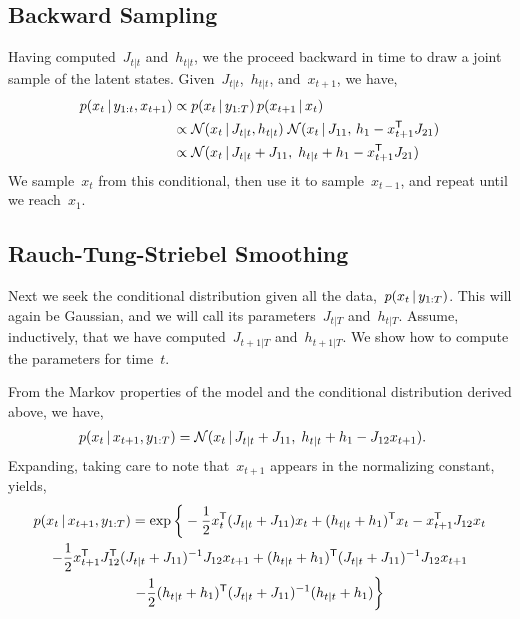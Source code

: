 \documentclass{article}
\begin{document}
\subsection*{Backward Sampling}
Having computed~$J_{t|t}$ and~$h_{t|t}$, we the proceed backward in time to draw a joint sample of the latent states. 
Given~$J_{t|t}$,~$h_{t|t}$, and~$x_{t+1}$, we have,
\begin{align}
  p(x_{t} \,|\, y_{1:t}, x_{t+1}) &\propto p(x_t \,|\, y_{1:T}) \, p(x_{t+1} \,|\, x_t) \\
  &\propto \mathcal{N}(x_t \,|\, J_{t|t}, h_{t|t})  \;
    \mathcal{N}(x_t \,|\, J_{11}, \, h_1 - x_{t+1}^{\mathsf{T}} J_{21} ) \\
  &\propto     \mathcal{N}(x_t \,|\, J_{t|t} + J_{11}, \; h_{t|t} + h_1 - x_{t+1}^{\mathsf{T}} J_{21} )
\end{align}
We sample~$x_t$ from this conditional, then use it to sample~$x_{t-1}$, and repeat until we reach~$x_1$.

\subsection*{Rauch-Tung-Striebel Smoothing}
Next we seek the conditional distribution given all the data,~$p(x_t \,|\, y_{1:T})$. 
This will again be Gaussian, and we will call its parameters~$J_{t|T}$ and~$h_{t|T}$. 
Assume, inductively, that we have computed~$J_{t+1|T}$ and~$h_{t+1|T}$. We show how to 
compute the parameters for time~$t$.

From the Markov properties of the model and the conditional distribution derived above, we have,
\begin{align}
  p(x_t \,|\, x_{t+1}, y_{1:T}) 
  &= \mathcal{N}(x_t \,|\, J_{t|t} + J_{11}, \; h_{t|t} + h_1 - J_{12} x_{t+1}).
\end{align}
Expanding, taking care to note that~$x_{t+1}$ appears in the normalizing constant, yields,
\begin{multline}
  p(x_t \,|\, x_{t+1}, y_{1:T}) 
  = \exp \bigg \{-\frac{1}{2} x_t^{\mathsf{T}} (J_{t|t} + J_{11}) x_t + (h_{t|t} + h_1)^{\mathsf{T}} x_t - x_{t+1}^{\mathsf{T}} J_{12} x_t 
  \\ 
-\frac{1}{2} x_{t+1}^{\mathsf{T}} J_{12}^{\mathsf{T}} (J_{t|t} + J_{11})^{-1} J_{12} x_{t+1} 
+(h_{t|t} + h_1)^{\mathsf{T}} (J_{t|t} + J_{11})^{-1} J_{12} x_{t+1} \\
- \frac{1}{2} (h_{t|t} + h_1)^{\mathsf{T}} (J_{t|t} + J_{11})^{-1} (h_{t|t} + h_1) 
    \bigg \}
\end{multline}
\end{document}
